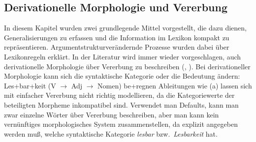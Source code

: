 

\subsection{Derivationelle Morphologie und Vererbung}
\label{sec-derivation-vererbung}

%
In diesem Kapitel wurden zwei grundlegende Mittel vorgestellt, die dazu dienen,
Generalisierungen zu erfassen und die Information im Lexikon kompakt zu repräsentieren.
Argumentstrukturverändernde Prozesse wurden dabei über Lexikonregeln erklärt. In der Literatur
wird immer wieder vorgeschlagen, auch derivationelle Morphologie über Vererbung zu beschreiben
(\citealp*[]{RCWA91a}, \citealp{MR2001a}).
Bei derivationeller Morphologie kann sich die syntaktische Kategorie oder die Bedeutung ändern:
\eal
\ex Les+bar+keit (V $\to$ Adj $\to$ Nomen)
\ex be+regnen
\zl
Ableitungen wie (a) lassen sich mit einfacher Vererbung nicht richtig modellieren, da
die Kategoriewerte der beteiligten Morpheme inkompatibel sind. Verwendet man Defaults, kann man
zwar einzelne Wörter über Vererbung beschreiben, aber man kann kein vernünftiges morphologisches
System zusammenstellen, da explizit angegeben werden muß, welche syntaktische Kategorie \emph{lesbar}
bzw.\ \emph{Lesbarkeit} hat.

